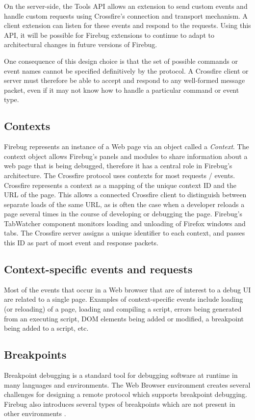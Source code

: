 On the server-side, the Tools API allows an extension to send custom events
and handle custom requests using Crossfire's connection and transport mechanism.
A client extension can listen for these events and respond to the requests.
Using this API, it will be possible for Firebug extensions to continue to adapt
to architectural changes in future versions of Firebug.

One consequence of this design choice is that the set of possible commands or
event names cannot be specified definitively by the protocol. A Crossfire
client or server must therefore be able to accept and respond to any well-formed
message packet, even if it may not know how to handle a particular command or
event type.

\subsection {Contexts}
Firebug represents an instance of a Web page via an object called a
\textit{Context}. The context object allows Firebug's panels and modules to
share information about a web page that is being debugged, therefore it has a
central role in Firebug's architecture. The Crossfire protocol uses contexts for
most requests / events. Crossfire represents a context as a mapping of the
unique context ID and the URL of the page. This allows a connected Crossfire
client to distinguish between separate loads of the same URL, as is often the
case when a developer reloads a page several times in the course of developing
or debugging the page.
Firebug's TabWatcher component monitors loading and unloading of Firefox windows
and tabs.  The Crossfire server assigns a unique identifier to each
context, and passes this ID as part of most event and response packets.

\subsection {Context-specific events and requests}
Most of the events that occur in a Web browser that are of interest to a debug
UI are related to a single page. Examples of context-specific events include
loading (or reloading) of a page, loading and compiling a script, errors being
generated from an executing script, DOM elements being added or modified, a
breakpoint being added to a script, etc.

\subsection {Breakpoints}
Breakpoint debugging is a standard tool for debugging software at runtime in
many languages and environments. The Web Browser environment creates several
challenges for designing a remote protocol which supports breakpoint debugging.
Firebug also introduces several types of breakpoints which are not present in
other environments \cite{jjb-www2010}.

